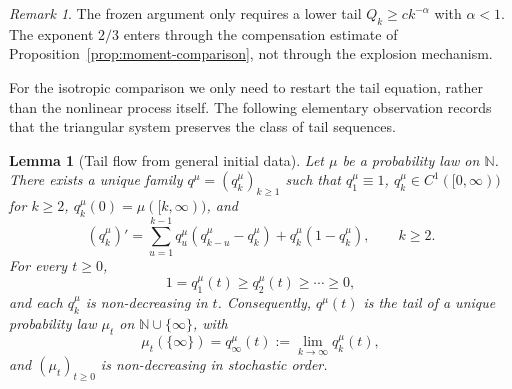 \documentclass[11pt,a4paper]{amsart}
\newtheorem{lemma}[theorem]{Lemma}
\theoremstyle{remark}
\newtheorem{remark}[theorem]{Remark}
\newcommand{\N}{\mathbb N}
\begin{document}
\begin{remark}
\label{rem:tail-explosion-criterion}
The frozen argument only requires a lower tail \(Q_k\geq ck^{-\alpha}\)
with \(\alpha<1\). The exponent \(2/3\) enters through the compensation
estimate of Proposition~\ref{prop:moment-comparison}, not through the
explosion mechanism.
\end{remark}

For the isotropic comparison we only need to restart the tail equation,
rather than the nonlinear process itself. The following elementary
observation records that the triangular system preserves the class of
tail sequences.

\begin{lemma}[Tail flow from general initial data]
\label{lem:tail-flow-general-data}
Let $\mu$ be a probability law on $\N$. There exists a unique family
$q^\mu=(q_k^\mu)_{k\geq1}$ such that $q_1^\mu\equiv1$,
$q_k^\mu\in C^1([0,\infty))$ for $k\geq2$,
$q_k^\mu(0)=\mu([k,\infty))$, and
\begin{equation}
\label{eq:general-tail-flow}
        (q_k^\mu)'
        =
        \sum_{u=1}^{k-1}q_u^\mu
        (q_{k-u}^\mu-q_k^\mu)
        +q_k^\mu(1-q_k^\mu),
        \qquad k\geq2.
\end{equation}
For every $t\geq0$,
\[
        1=q_1^\mu(t)\geq q_2^\mu(t)\geq\cdots\geq0,
\]
and each $q_k^\mu$ is non-decreasing in $t$. Consequently,
$q^\mu(t)$ is the tail of a unique probability law $\mu_t$ on
$\N\cup\{\infty\}$, with
\[
        \mu_t(\{\infty\})
        =
        q_\infty^\mu(t)
        :=
        \lim_{k\to\infty}q_k^\mu(t),
\]
and $(\mu_t)_{t\geq0}$ is non-decreasing in stochastic order.
\end{lemma}
\end{document}
